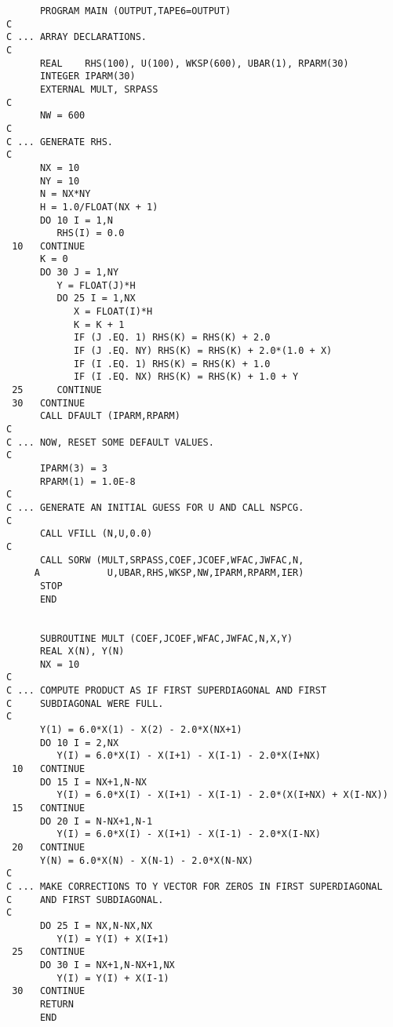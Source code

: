\begin{verbatim}
      PROGRAM MAIN (OUTPUT,TAPE6=OUTPUT)
C
C ... ARRAY DECLARATIONS.
C
      REAL    RHS(100), U(100), WKSP(600), UBAR(1), RPARM(30)
      INTEGER IPARM(30)
      EXTERNAL MULT, SRPASS
C
      NW = 600
C
C ... GENERATE RHS. 
C
      NX = 10
      NY = 10
      N = NX*NY
      H = 1.0/FLOAT(NX + 1)
      DO 10 I = 1,N 
         RHS(I) = 0.0
 10   CONTINUE
      K = 0
      DO 30 J = 1,NY
         Y = FLOAT(J)*H
         DO 25 I = 1,NX
            X = FLOAT(I)*H
            K = K + 1
            IF (J .EQ. 1) RHS(K) = RHS(K) + 2.0
            IF (J .EQ. NY) RHS(K) = RHS(K) + 2.0*(1.0 + X)
            IF (I .EQ. 1) RHS(K) = RHS(K) + 1.0
            IF (I .EQ. NX) RHS(K) = RHS(K) + 1.0 + Y
 25      CONTINUE
 30   CONTINUE
      CALL DFAULT (IPARM,RPARM)
C
C ... NOW, RESET SOME DEFAULT VALUES.
C
      IPARM(3) = 3
      RPARM(1) = 1.0E-8
C
C ... GENERATE AN INITIAL GUESS FOR U AND CALL NSPCG.
C
      CALL VFILL (N,U,0.0)
C
      CALL SORW (MULT,SRPASS,COEF,JCOEF,WFAC,JWFAC,N,
     A            U,UBAR,RHS,WKSP,NW,IPARM,RPARM,IER)
      STOP
      END 


      SUBROUTINE MULT (COEF,JCOEF,WFAC,JWFAC,N,X,Y)
      REAL X(N), Y(N)
      NX = 10
C
C ... COMPUTE PRODUCT AS IF FIRST SUPERDIAGONAL AND FIRST
C     SUBDIAGONAL WERE FULL.
C
      Y(1) = 6.0*X(1) - X(2) - 2.0*X(NX+1)
      DO 10 I = 2,NX
         Y(I) = 6.0*X(I) - X(I+1) - X(I-1) - 2.0*X(I+NX)
 10   CONTINUE
      DO 15 I = NX+1,N-NX
         Y(I) = 6.0*X(I) - X(I+1) - X(I-1) - 2.0*(X(I+NX) + X(I-NX))
 15   CONTINUE
      DO 20 I = N-NX+1,N-1
         Y(I) = 6.0*X(I) - X(I+1) - X(I-1) - 2.0*X(I-NX)
 20   CONTINUE
      Y(N) = 6.0*X(N) - X(N-1) - 2.0*X(N-NX)
C
C ... MAKE CORRECTIONS TO Y VECTOR FOR ZEROS IN FIRST SUPERDIAGONAL
C     AND FIRST SUBDIAGONAL.
C
      DO 25 I = NX,N-NX,NX
         Y(I) = Y(I) + X(I+1) 
 25   CONTINUE
      DO 30 I = NX+1,N-NX+1,NX
         Y(I) = Y(I) + X(I-1) 
 30   CONTINUE
      RETURN
      END 



\end{verbatim}
